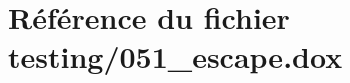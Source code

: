 \hypertarget{051__escape_8dox}{}\section{Référence du fichier testing/051\+\_\+escape.dox}
\label{051__escape_8dox}
